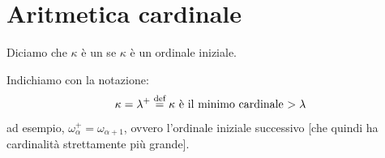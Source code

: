 \section{Aritmetica cardinale}

\begin{definition}[Cardinali]
	Diciamo che $\kappa$ \`e un  se $\kappa$ \`e un ordinale iniziale.
\end{definition}

\begin{notation}
	Indichiamo con la notazione:
	\[ \kappa = \lambda^+ \overset{\text{def}}{=} \text{$\kappa$ \`e il minimo cardinale $>\lambda$}
		\]
	ad esempio, $\omega_\alpha^+ = \omega_{\alpha + 1}$, ovvero l'ordinale iniziale successivo [che quindi ha cardinalit\`a strettamente pi\`u grande].
\end{notation}

